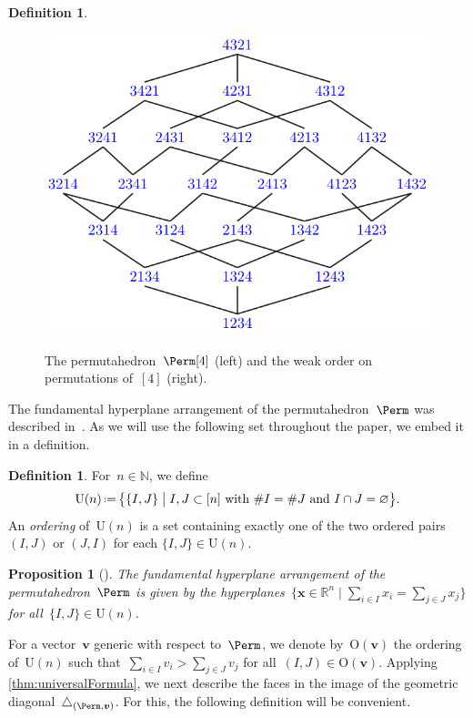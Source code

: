 \documentclass{amsart}
\newcommand{\darkblue}{\color{darkblue}} %
\newtheorem{proposition}[theorem]{Proposition}
\theoremstyle{definition}
\newtheorem{definition}[theorem]{Definition}
\newcommand{\R}{\mathbb{R}} %
\newcommand{\N}{\mathbb{N}} %
\renewcommand{\b}[1]{{\boldsymbol{#1}}} %
\newcommand{\Un}{\mathrm{U}} %
\newcommand{\Or}{\mathrm{O}} %
\newcommand{\bigset}[2]{\big\{ #1 \;\big|\; #2 \big\}} %
\newcommand{\eqdef}{\mbox{\,\raisebox{0.2ex}{\scriptsize\ensuremath{\mathrm:}}\ensuremath{=}\,}} %
\newcommand{\card}[1]{\##1} %
\newcommand{\defn}[1]{\textsl{\darkblue #1}} %
\renewcommand{\b}[1]{\boldsymbol{#1}} %
\begin{document}
\begin{definition}
\begin{figure}
{		\includegraphics[scale=.7]{weakOrder}
	}
	\caption{The permutahedron~$\Perm[4]$ (left) and the weak order on permutations of~$[4]$ (right).}
	\label{fig:permutahedron}
\end{figure}
\end{definition}

The fundamental hyperplane arrangement of the permutahedron~$\Perm$ was described in~\cite[Sect.~3.1]{LaplanteAnfossi}.
As we will use the following set throughout the paper, we embed it in a definition.

\begin{definition}
\label{def:Un}
For~$n \in \N$, we define
\[
\Un(n) \eqdef \bigset{\{I,J\}}{I,J \subset [n] \text{ with } \card{I}=\card{J} \text{ and } I \cap J = \varnothing}.
\]
An \defn{ordering} of~$\Un(n)$ is a set containing exactly one of the two ordered pairs $(I,J)$ or $(J,I)$ for each $\{I,J\} \in \Un(n)$.
\end{definition}

\begin{proposition}[{\cite[Sect.~3.1]{LaplanteAnfossi}}]
The fundamental hyperplane arrangement of the permutahedron~$\Perm$ is given by the hyperplanes~$\bigset{\b{x} \in \R^n}{\sum\limits_{i \in I} x_i = \sum\limits_{j \in J} x_j}$ for all~$\{I,J\} \in \Un(n)$.
\end{proposition}

For a vector~$\b{v}$ generic with respect to~$\Perm$, we denote by~$\Or(\b{v})$ the ordering of~$\Un(n)$ such that~$\sum_{i \in I} v_i > \sum_{j \in J} v_j$ for all~$(I,J) \in \Or(\b{v})$.
Applying \cref{thm:universalFormula}, we next describe the faces in the image of the geometric diagonal~$\triangle_{(\Perm, \b{v})}$.
For this, the following definition will be convenient.
\end{document}

